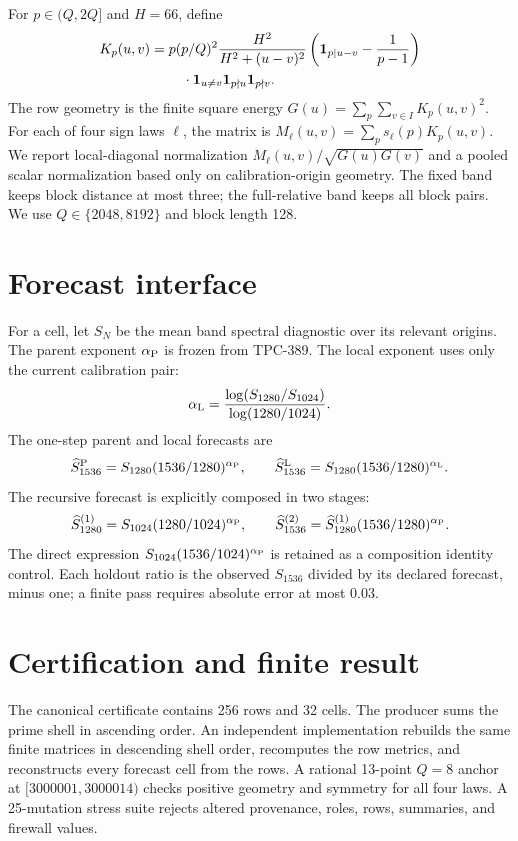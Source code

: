 \documentclass[10pt]{article}
\begin{document}
For $p\in(Q,2Q]$ and $H=66$, define
\begin{align*}
 K_p(u,v)={}&p(p/Q)^2\frac{H^2}{H^2+(u-v)^2}
 \left({\bf 1}_{p\mid u-v}-\frac{1}{p-1}\right)\\
 &\quad\cdot\mathbf{1}_{u\ne v}\mathbf{1}_{p\nmid u}\mathbf{1}_{p\nmid v}.
\end{align*}
The row geometry is the finite square energy
$G(u)=\sum_{p}\sum_{v\in I}K_p(u,v)^2$.  For each of four sign laws
$\ell$, the matrix is $M_\ell(u,v)=\sum_p s_\ell(p)K_p(u,v)$.  We report
local-diagonal normalization $M_\ell(u,v)/\sqrt{G(u)G(v)}$ and a pooled
scalar normalization based only on calibration-origin geometry.  The fixed
band keeps block distance at most three; the full-relative band keeps all
block pairs.  We use $Q\in\{2048,8192\}$ and block length 128.

\section{Forecast interface}

For a cell, let $S_N$ be the mean band spectral diagnostic over its relevant
origins.  The parent exponent $\alpha_{\rm P}$ is frozen from TPC-389.  The
local exponent uses only the current calibration pair:
\[
 \alpha_{\rm L}=
 \frac{\log(S_{1280}/S_{1024})}{\log(1280/1024)}.
\]
The one-step parent and local forecasts are
\[
 \widehat S_{1536}^{\rm P}
   =S_{1280}(1536/1280)^{\alpha_{\rm P}},\qquad
 \widehat S_{1536}^{\rm L}
   =S_{1280}(1536/1280)^{\alpha_{\rm L}}.
\]
The recursive forecast is explicitly composed in two stages:
\[
 \widehat S_{1280}^{(1)}=S_{1024}(1280/1024)^{\alpha_{\rm P}},\qquad
 \widehat S_{1536}^{(2)}=
 \widehat S_{1280}^{(1)}(1536/1280)^{\alpha_{\rm P}}.
\]
The direct expression $S_{1024}(1536/1024)^{\alpha_{\rm P}}$ is retained as
a composition identity control.  Each holdout ratio is the observed $S_{1536}$
divided by its declared forecast, minus one; a finite pass requires absolute
error at most $0.03$.

\section{Certification and finite result}

The canonical certificate contains 256 rows and 32 cells.  The producer sums
the prime shell in ascending order.  An independent implementation rebuilds
the same finite matrices in descending shell order, recomputes the row
metrics, and reconstructs every forecast cell from the rows.  A rational
13-point $Q=8$ anchor at $[3000001,3000014)$ checks positive geometry and
symmetry for all four laws.  A 25-mutation stress suite rejects altered
provenance, roles, rows, summaries, and firewall values.
\end{document}
